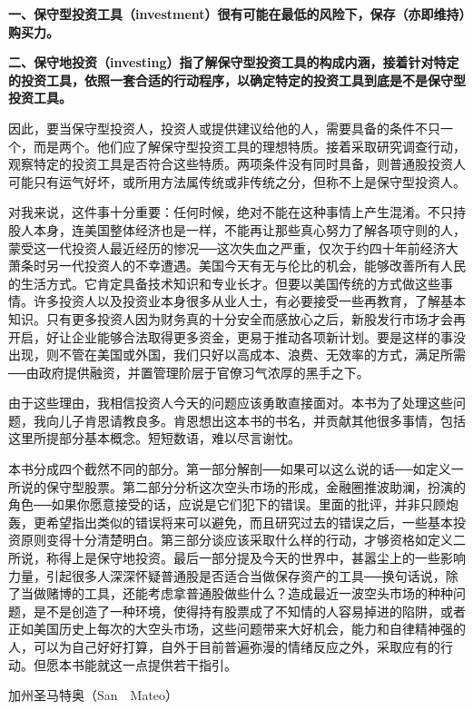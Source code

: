 \documentclass[UTF8,a4paper,zihao=-4,fontset = windows]{ctexart} %
\begin{document}
\textbf{一、保守型投资工具（investment）很有可能在最低的风险下，保存（亦即维持）购买力。}

\textbf{二、保守地投资（investing）指了解保守型投资工具的构成内涵，接着针对特定的投资工具，依照一套合适的行动程序，以确定特定的投资工具到底是不是保守型投资工具。}


因此，要当保守型投资人，投资人或提供建议给他的人，需要具备的条件不只一个，而是两个。他们应了解保守型投资工具的理想特质。接着采取研究调查行动，观察特定的投资工具是否符合这些特质。两项条件没有同时具备，则普通股投资人可能只有运气好坏，或所用方法属传统或非传统之分，但称不上是保守型投资人。

对我来说，这件事十分重要：任何时候，绝对不能在这种事情上产生混淆。不只持股人本身，连美国整体经济也是一样，不能再让那些真心努力了解各项守则的人，蒙受这一代投资人最近经历的惨况──这次失血之严重，仅次于约四十年前经济大萧条时另一代投资人的不幸遭遇。美国今天有无与伦比的机会，能够改善所有人民的生活方式。它肯定具备技术知识和专业长才。但要以美国传统的方式做这些事情。许多投资人以及投资业本身很多从业人士，有必要接受一些再教育，了解基本知识。只有更多投资人因为财务真的十分安全而感放心之后，新股发行市场才会再开启，好让企业能够合法取得更多资金，更易于推动各项新计划。要是这样的事没出现，则不管在美国或外国，我们只好以高成本、浪费、无效率的方式，满足所需──由政府提供融资，并置管理阶层于官僚习气浓厚的黑手之下。

由于这些理由，我相信投资人今天的问题应该勇敢直接面对。本书为了处理这些问题，我向儿子肯恩请教良多。肯恩想出这本书的书名，并贡献其他很多事情，包括这里所提部分基本概念。短短数语，难以尽言谢忱。

本书分成四个截然不同的部分。第一部分解剖──如果可以这么说的话──如定义一所说的保守型股票。第二部分分析这次空头市场的形成，金融圈推波助澜，扮演的角色──如果你愿意接受的话，应说是它们犯下的错误。里面的批评，并非只顾炮轰，更希望指出类似的错误将来可以避免，而且研究过去的错误之后，一些基本投资原则变得十分清楚明白。第三部分谈应该采取什么样的行动，才够资格如定义二所说，称得上是保守地投资。最后一部分提及今天的世界中，甚嚣尘上的一些影响力量，引起很多人深深怀疑普通股是否适合当做保存资产的工具──换句话说，除了当做赌博的工具，还能考虑拿普通股做些什么？造成最近一波空头市场的种种问题，是不是创造了一种环境，使得持有股票成了不知情的人容易掉进的陷阱，或者正如美国历史上每次的大空头市场，这些问题带来大好机会，能力和自律精神强的人，可以为自己好好打算，自外于目前普遍弥漫的情绪反应之外，采取应有的行动。但愿本书能就这一点提供若干指引。


加州圣马特奥（San　Mateo）
\end{document}
